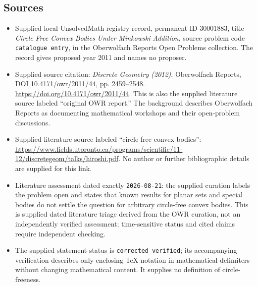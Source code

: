 \documentclass[11pt]{article}
\begin{document}
\subsection{Sources}
\begin{itemize}
\item Supplied local UnsolvedMath registry record, permanent ID \(30001883\), title \emph{Circle Free Convex Bodies Under Minkowski Addition}, source problem code \texttt{catalogue entry}, in the Oberwolfach Reports Open Problems collection. The record gives proposed year 2011 and names no proposer.
\item Supplied source citation: \emph{Discrete Geometry (2012)}, Oberwolfach Reports, DOI 10.4171/owr/2011/44, pp. 2459--2548. \url{https://doi.org/10.4171/owr/2011/44}. This is also the supplied literature source labeled ``original OWR report.'' The background describes Oberwolfach Reports as documenting mathematical workshops and their open-problem discussions.
\item Supplied literature source labeled ``circle-free convex bodies'': \url{https://www.fields.utoronto.ca/programs/scientific/11-12/discretegeom/talks/hiroshi.pdf}. No author or further bibliographic details are supplied for this link.
\item Literature assessment dated exactly \texttt{2026-08-21}: the supplied curation labels the problem open and states that known results for planar sets and special bodies do not settle the question for arbitrary circle-free convex bodies. This is supplied dated literature triage derived from the OWR curation, not an independently verified assessment; time-sensitive status and cited claims require independent checking.
\item The supplied statement status is \texttt{corrected\_verified}; its accompanying verification describes only enclosing TeX notation in mathematical delimiters without changing mathematical content. It supplies no definition of circle-freeness.
\end{itemize}
\end{document}
